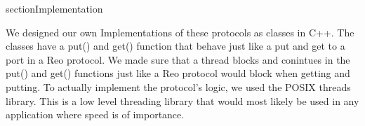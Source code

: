 section{Implementation}

We designed our own Implementations of these protocols as classes in C++.
The classes have a put() and get() function that behave just like a put and get to a port in a Reo protocol.
We made sure that a thread blocks and conintues in the put() and get() functions just like a Reo protocol would block when getting and putting.
To actually implement the protocol's logic, we used the POSIX threads library.
This is a low level threading library that would most likely be used in any application where speed is of importance.

